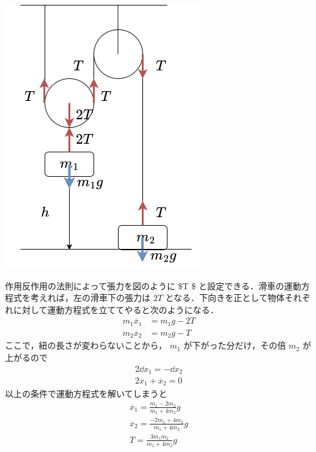 \documentclass[
  b4paperpaper,
  xelatex,ja=standard]{bxjsbook}
\begin{document}

\includegraphics{source/images/newton/newton10.png}

作用反作用の法則によって張力を図のように \$T \$
と設定できる．滑車の運動方程式を考えれば，左の滑車下の張力は \(2T\)
となる．下向きを正として物体それぞれに対して運動方程式を立ててやると次のようになる．
\begin{align*}
m_1\ddot{x_1} &= m_1g-2T \\
m_2\ddot{x_2} &= m_2g-T
\end{align*} ここで，紐の長さが変わらないことから， \(m_1\)
が下がった分だけ，その倍 \(m_2\) が上がるので \begin{align*}
2\dd x_1=-\dd x_2 \\
2\ddot{x_1}+\ddot{x_2}=0
\end{align*} 以上の条件で運動方程式を解いてしまうと \begin{align*}
\ddot{x_1}=\frac{m_1-2m_2}{m_1+4m_2}g \\
\ddot{x_2}=\frac{-2m_1+4m_2}{m_1+4m_2}g \\
T=\frac{3m_1m_2}{m_1+4m_2}g
\end{align*}
\end{document}
